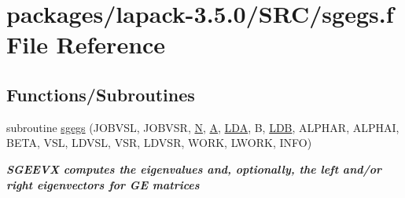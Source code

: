\hypertarget{sgegs_8f}{}\section{packages/lapack-\/3.5.0/\+S\+R\+C/sgegs.f File Reference}
\label{sgegs_8f}
\subsection*{Functions/\+Subroutines}
\begin{DoxyCompactItemize}
\item 
subroutine \hyperlink{group__realGEeigen_gad6edd6ac01e4a249743c45803d9b37a2}{sgegs} (J\+O\+B\+V\+S\+L, J\+O\+B\+V\+S\+R, \hyperlink{polmisc_8c_a0240ac851181b84ac374872dc5434ee4}{N}, \hyperlink{classA}{A}, \hyperlink{example__user_8c_ae946da542ce0db94dced19b2ecefd1aa}{L\+D\+A}, B, \hyperlink{example__user_8c_a50e90a7104df172b5a89a06c47fcca04}{L\+D\+B}, A\+L\+P\+H\+A\+R, A\+L\+P\+H\+A\+I, B\+E\+T\+A, V\+S\+L, L\+D\+V\+S\+L, V\+S\+R, L\+D\+V\+S\+R, W\+O\+R\+K, L\+W\+O\+R\+K, I\+N\+F\+O)
\begin{DoxyCompactList}\small\item\em {\bfseries  S\+G\+E\+E\+V\+X computes the eigenvalues and, optionally, the left and/or right eigenvectors for G\+E matrices} \end{DoxyCompactList}\end{DoxyCompactItemize}
